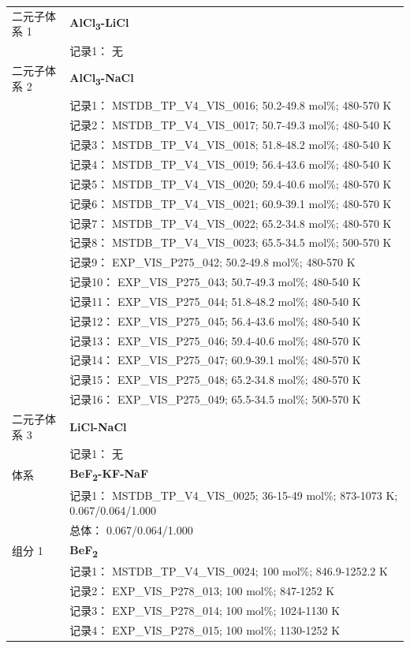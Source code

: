 \documentclass[12pt]{article}
\begin{document}
{\begin{longtable}[]{@{}
  >{\raggedright\arraybackslash}p{}
  >{\raggedright\arraybackslash}p{}@{}}
二元子体系 1 & \textbf{AlCl\textsubscript{3}-LiCl} \\
 & 记录1： 无 \\
二元子体系 2  & \textbf{AlCl\textsubscript{3}-NaCl} \\
 & 记录1： MSTDB\_TP\_V4\_VIS\_0016; 50.2-49.8 mol\%; 480-570 K \\
 & 记录2： MSTDB\_TP\_V4\_VIS\_0017; 50.7-49.3 mol\%; 480-540 K \\
 & 记录3： MSTDB\_TP\_V4\_VIS\_0018; 51.8-48.2 mol\%; 480-540 K \\
 & 记录4： MSTDB\_TP\_V4\_VIS\_0019; 56.4-43.6 mol\%; 480-540 K \\
 & 记录5： MSTDB\_TP\_V4\_VIS\_0020; 59.4-40.6 mol\%; 480-570 K \\
 & 记录6： MSTDB\_TP\_V4\_VIS\_0021; 60.9-39.1 mol\%; 480-570 K \\
 & 记录7： MSTDB\_TP\_V4\_VIS\_0022; 65.2-34.8 mol\%; 480-570 K \\
 & 记录8： MSTDB\_TP\_V4\_VIS\_0023; 65.5-34.5 mol\%; 500-570 K \\
 & 记录9： EXP\_VIS\_P275\_042; 50.2-49.8 mol\%; 480-570 K \\
 & 记录10： EXP\_VIS\_P275\_043; 50.7-49.3 mol\%; 480-540 K \\
 & 记录11： EXP\_VIS\_P275\_044; 51.8-48.2 mol\%; 480-540 K \\
 & 记录12： EXP\_VIS\_P275\_045; 56.4-43.6 mol\%; 480-540 K \\
 & 记录13： EXP\_VIS\_P275\_046; 59.4-40.6 mol\%; 480-570 K \\
 & 记录14： EXP\_VIS\_P275\_047; 60.9-39.1 mol\%; 480-570 K \\
 & 记录15： EXP\_VIS\_P275\_048; 65.2-34.8 mol\%; 480-570 K \\
 & 记录16： EXP\_VIS\_P275\_049; 65.5-34.5 mol\%; 500-570 K  \\

二元子体系 3 & \textbf{LiCl-NaCl} \\
 & 记录1： 无 \\
\midrule
体系 & \textbf{BeF\textsubscript{2}-KF-NaF} \\
 & 记录1： MSTDB\_TP\_V4\_VIS\_0025; 36-15-49 mol\%; 873-1073 K; 0.067/0.064/1.000 \\
 & 总体： 0.067/0.064/1.000  \\

组分 1  & \textbf{BeF\textsubscript{2}} \\
 & 记录1： MSTDB\_TP\_V4\_VIS\_0024; 100 mol\%; 846.9-1252.2 K \\
 & 记录2： EXP\_VIS\_P278\_013; 100 mol\%; 847-1252 K \\
 & 记录3： EXP\_VIS\_P278\_014; 100 mol\%; 1024-1130 K \\
 & 记录4： EXP\_VIS\_P278\_015; 100 mol\%; 1130-1252 K  \\


\end{longtable}}
\end{document}
